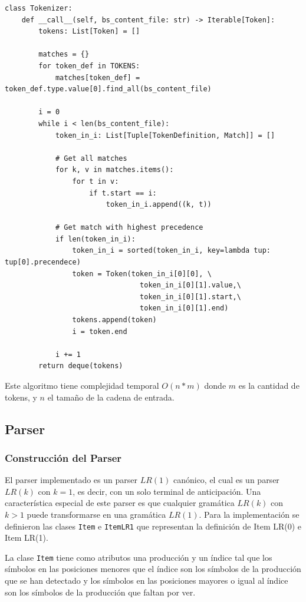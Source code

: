 \begin{verbatim}
class Tokenizer:
    def __call__(self, bs_content_file: str) -> Iterable[Token]:
        tokens: List[Token] = []

        matches = {}
        for token_def in TOKENS:
            matches[token_def] = token_def.type.value[0].find_all(bs_content_file)
        
        i = 0
        while i < len(bs_content_file):
            token_in_i: List[Tuple[TokenDefinition, Match]] = []

            # Get all matches
            for k, v in matches.items():
                for t in v:
                    if t.start == i:
                        token_in_i.append((k, t))
                    
            # Get match with highest precedence
            if len(token_in_i):
                token_in_i = sorted(token_in_i, key=lambda tup: tup[0].precendece)
                token = Token(token_in_i[0][0], \
                                token_in_i[0][1].value,\
                                token_in_i[0][1].start,\
                                token_in_i[0][1].end)
                tokens.append(token)    
                i = token.end

            i += 1
        return deque(tokens)
\end{verbatim}

Este algoritmo tiene complejidad temporal $O(n*m)$ donde $m$ es la cantidad de tokens, y $n$ el tamaño de la cadena de entrada.

\subsection{Parser}

\subsubsection{Construcci\'on del Parser}

El parser implementado es un parser $LR(1)$ can\'onico, el cual es un parser $LR(k)$ con $k = 1$, es decir, con un solo terminal de anticipación. Una característica especial de este parser es que cualquier gramática $LR(k)$ con $k>1$ puede transformarse en una gramática $LR(1)$. Para la implementación se definieron las clases \verb|Item| e \verb|ItemLR1| que representan la definici\'on de Item LR(0) e Item LR(1).

La clase \verb|Item| tiene como atributos una producci\'on y un \'indice tal que los s\'imbolos en las posiciones menores que el \'indice son los s\'imbolos de la producci\'on que se han detectado y los s\'imbolos en las posiciones mayores o igual al \'indice son los s\'imbolos de la producci\'on que faltan por ver.

